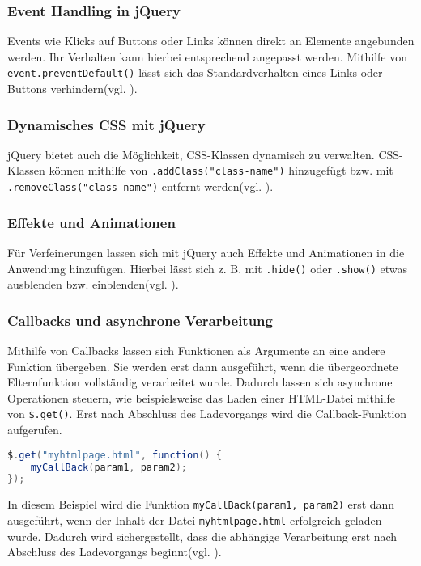 \documentclass[oneside]{ausarbeitung}
\begin{document}
\subsubsection{Event Handling in jQuery}
Events wie Klicks auf Buttons oder Links können direkt an Elemente angebunden werden. Ihr Verhalten kann hierbei entsprechend angepasst werden. Mithilfe von  
\texttt{event.preventDefault()} lässt sich das Standardverhalten eines Links oder Buttons verhindern(vgl. \parencite{jqueryAPI}).  

\subsubsection{Dynamisches CSS mit jQuery}
jQuery bietet auch die Möglichkeit, CSS-Klassen dynamisch zu verwalten.  
CSS-Klassen können mithilfe von \texttt{.addClass("class-name")} hinzugefügt bzw. mit \texttt{.removeClass("class-name")} entfernt werden(vgl. \parencite{jqueryAPI}).  

\subsubsection{Effekte und Animationen}
Für Verfeinerungen lassen sich mit jQuery auch Effekte und Animationen in die Anwendung hinzufügen. Hierbei lässt sich z. B. mit \texttt{.hide()} oder \texttt{.show()} etwas ausblenden bzw. einblenden(vgl. \parencite{jqueryAPI}).  

\subsubsection{Callbacks und asynchrone Verarbeitung}
Mithilfe von Callbacks lassen sich Funktionen als Argumente an eine andere Funktion übergeben. Sie werden erst dann ausgeführt, wenn die übergeordnete Elternfunktion vollständig verarbeitet wurde. Dadurch lassen sich asynchrone Operationen steuern, wie beispielsweise das Laden einer HTML-Datei mithilfe von \texttt{\$.get()}. Erst nach Abschluss des Ladevorgangs wird die Callback-Funktion aufgerufen.  

\begin{lstlisting}[language=Java, caption={Verwendung eines Callbacks in jQuery}]
$.get("myhtmlpage.html", function() { 
    myCallBack(param1, param2); 
});
\end{lstlisting}

In diesem Beispiel wird die Funktion \texttt{myCallBack(param1, param2)} erst dann ausgeführt, wenn der Inhalt der Datei \texttt{myhtmlpage.html} erfolgreich geladen wurde. Dadurch wird sichergestellt, dass die abhängige Verarbeitung erst nach Abschluss des Ladevorgangs beginnt(vgl. \parencite{jqueryAPI}).  
\end{document}
